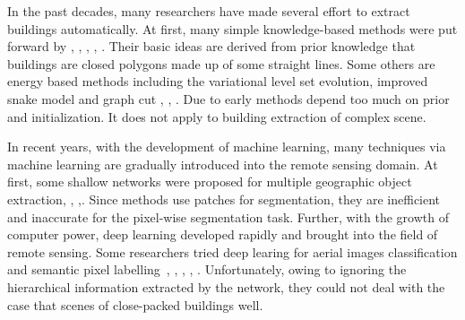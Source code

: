 In the past decades, many researchers have made several effort to extract buildings automatically.
At first, many simple knowledge-based methods were put forward by \cite{IEEEexample:huertas1988detecting}, \cite{IEEEexample:noronha2001detection}, \cite{IEEEexample:nosrati2009novel}, \cite{IEEEexample:izadi2012three}, \cite{IEEEexample:wang2015efficient}.
Their basic ideas are derived from prior knowledge that buildings are closed polygons made up of some straight lines.
Some others are energy based methods including the variational level set evolution, improved snake model and graph cut \cite{IEEEexample:cote2013automatic}, \cite{IEEEexample:peng2005improved}, \cite{IEEEexample:sirmacek2009urban}. Due to early methods depend too much on prior and initialization. It does not apply to building extraction of complex scene.


In recent years, with the development of machine learning, many techniques via machine learning are gradually introduced into the remote sensing domain.
At first, some shallow networks were proposed for multiple geographic object extraction\cite{IEEEexample:mnih2013machine}, \cite{IEEEexample:saito2016multiple}, \cite{IEEEexample:alshehhi2017simultaneous},\cite{IEEEexample:zhao2017contextually}. Since methods use patches for segmentation, they are inefficient and inaccurate for the pixel-wise segmentation task.
Further, with the growth of computer power, deep learning developed rapidly and brought into the field of remote sensing. Some researchers tried deep learing for aerial images classification and semantic pixel labelling~\cite{IEEEexample:paisitkriangkrai2015effective}, \cite{IEEEexample:liu2017dense}, \cite{IEEEexample:audebert2017deep}, \cite{IEEEexample:kampffmeyer2017urban}, \cite{IEEEexample:he2017multi}. Unfortunately, owing to ignoring the hierarchical information extracted by the network, they could not deal with the case that scenes of close-packed buildings well.



